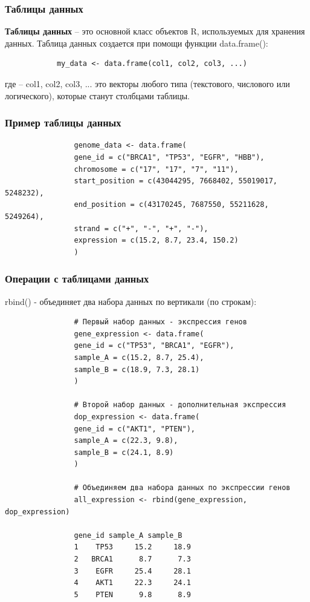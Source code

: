 \documentclass[11pt,a4paper]{beamer}
\begin{document}
	\begin{frame}[fragile]
		\frametitle{Таблицы данных}
		\textbf{Таблицы данных} – это основной класс объектов R, используемых для хранения данных.  Таблица данных создается при помощи функции data.frame():
		\begin{verbatim}
			my_data <- data.frame(col1, col2, col3, ...)
		\end{verbatim}
		где – col1, col2, col3, ... это векторы любого типа (текстового, числового или логического), которые станут столбцами таблицы.	
	\end{frame}
	
	\begin{frame}[fragile]
		
		
		\frametitle{Пример таблицы данных}
		{\fontsize{9}{11}\selectfont
			\begin{verbatim}
				genome_data <- data.frame(
				gene_id = c("BRCA1", "TP53", "EGFR", "HBB"),
				chromosome = c("17", "17", "7", "11"),
				start_position = c(43044295, 7668402, 55019017, 5248232),
				end_position = c(43170245, 7687550, 55211628, 5249264),
				strand = c("+", "-", "+", "-"),
				expression = c(15.2, 8.7, 23.4, 150.2)
				)
			\end{verbatim}	
		}
	\end{frame}
	
	\begin{frame}[fragile]
		\frametitle{Операции с таблицами данных}
		rbind() - объединяет два набора данных по вертикали (по строкам):
		{\fontsize{6}{8}\selectfont	
			\begin{verbatim}
				# Первый набор данных - экспрессия генов
				gene_expression <- data.frame(
				gene_id = c("TP53", "BRCA1", "EGFR"),
				sample_A = c(15.2, 8.7, 25.4),
				sample_B = c(18.9, 7.3, 28.1)
				)
				
				# Второй набор данных - дополнительная экспрессия
				dop_expression <- data.frame(
				gene_id = c("AKT1", "PTEN"),
				sample_A = c(22.3, 9.8),
				sample_B = c(24.1, 8.9)
				)
				
				# Объединяем два набора данных по экспрессии генов
				all_expression <- rbind(gene_expression, dop_expression)
				
				gene_id sample_A sample_B
				1    TP53     15.2     18.9
				2   BRCA1      8.7      7.3
				3    EGFR     25.4     28.1
				4    AKT1     22.3     24.1
				5    PTEN      9.8      8.9		
			\end{verbatim}
		}	
		
	\end{frame}
	
\end{document}
